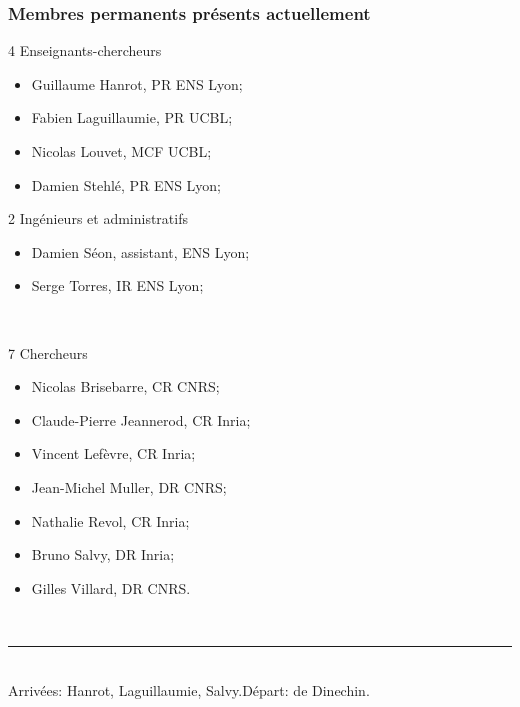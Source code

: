 \documentclass[mathsans]{beamer}
\begin{document}
\begin{frame}
\frametitle{Membres permanents présents actuellement}
\begin{small}
\begin{minipage}{6.2cm}
\alert{4 Enseignants-chercheurs}
\begin{itemize}
    \item Guillaume Hanrot, PR ENS Lyon;
    \item Fabien Laguillaumie, PR UCBL;
    \item Nicolas Louvet, MCF UCBL;
    \item Damien Stehlé, PR ENS Lyon;
 \end{itemize} 
 \alert{2 Ingénieurs et administratifs}
 \begin{itemize}
     \item Damien Séon, assistant, ENS Lyon;
     \item Serge Torres, IR ENS Lyon;
   \end{itemize}
\end{minipage}~
\begin{minipage}{6cm}
 \alert{7 Chercheurs}
 \begin{itemize}
    \item Nicolas Brisebarre, CR CNRS;
    \item Claude-Pierre Jeannerod, CR Inria;
    \item Vincent Lefèvre, CR Inria;
    \item Jean-Michel Muller, DR CNRS;
    \item Nathalie Revol, CR Inria;
    \item Bruno Salvy, DR Inria;
    \item Gilles Villard, DR CNRS.
 \end{itemize}
\end{minipage}~\\[0.7cm]
\hrule~\\
\alert{Arrivées:} Hanrot, Laguillaumie, Salvy.\hspace{1cm}\alert{Départ:} de Dinechin.
\end{small}
\end{frame}
\end{document}
